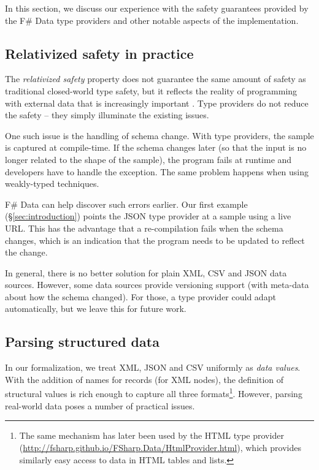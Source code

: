 \documentclass[10pt,preprint,blind,clearpagebib]{sigplanconf}
\begin{document}
In this section, we discuss our experience with the safety guarantees provided by the
F\# Data type providers and other notable aspects of the implementation.

\subsection{Relativized safety in practice}
\label{sec:safety-discuss}

The \emph{relativized safety} property does not guarantee the same amount of safety as traditional
closed-world type safety, but it reflects the reality of programming with external data that is 
increasingly important \cite{age-of-web}. Type providers do not reduce the safety -- they simply 
illuminate the existing issues.

One such issue is the handling of schema change. With type providers, the sample is captured 
at compile-time. If the schema changes later (so that the input is no longer related to the  
shape of the sample), the program fails at runtime and developers have to handle the exception. 
The same problem happens when using weakly-typed techniques.

F\# Data can help discover such errors earlier. Our first example (\S\ref{sec:introduction})
points the JSON type provider at a sample using a live URL. This has the advantage that a re-compilation 
fails when the schema changes, which is an indication that the program needs to be updated to reflect the
change.

In general, there is no better solution for plain XML, CSV and JSON data sources. However, some data 
sources provide versioning support (with meta-data about how the schema changed). For those, a type 
provider could adapt automatically, but we leave this for future work.


\subsection{Parsing structured data}
\label{sec:impl-parsing}

In our formalization, we treat XML, JSON and CSV uniformly as \emph{data values}. With the addition of 
names for records (for XML nodes), the definition of structural values is rich enough to capture all 
three formats\footnote{The same mechanism has later been used by the HTML type provider 
(\url{http://fsharp.github.io/FSharp.Data/HtmlProvider.html}), which provides similarly easy 
access to data in HTML tables and lists.}. However, parsing real-world data poses a number of practical issues.
\end{document}
